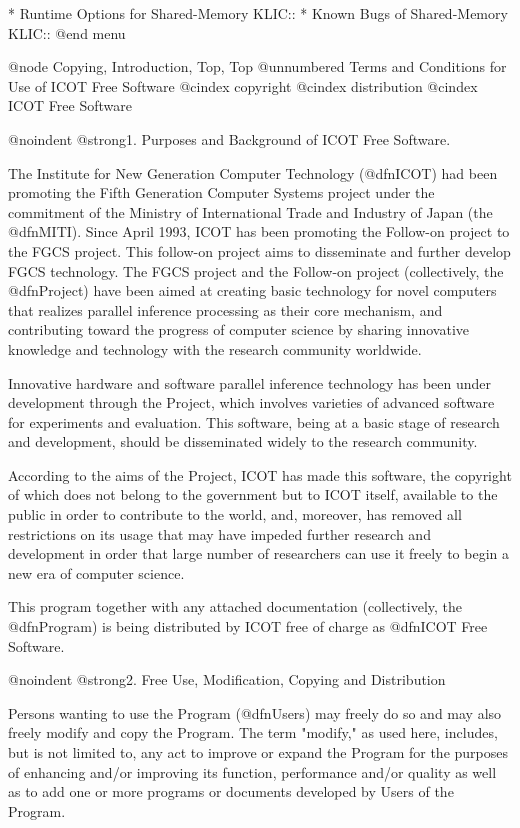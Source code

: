 * Runtime Options for Shared-Memory KLIC::  
* Known Bugs of Shared-Memory KLIC::  
@end menu

@node Copying, Introduction, Top, Top
@unnumbered Terms and Conditions for Use of ICOT Free Software
@cindex copyright
@cindex distribution
@cindex ICOT Free Software

@noindent
@strong{1. Purposes and Background of ICOT Free Software.}

The Institute for New Generation Computer Technology (@dfn{ICOT}) had
been promoting the Fifth Generation Computer Systems project under the
commitment of the Ministry of International Trade and Industry of Japan
(the @dfn{MITI}).  Since April 1993, ICOT has been promoting the
Follow-on project to the FGCS project. This follow-on project aims to
disseminate and further develop FGCS technology.  The FGCS project and
the Follow-on project (collectively, the @dfn{Project}) have been aimed
at creating basic technology for novel computers that realizes parallel
inference processing as their core mechanism, and contributing toward
the progress of computer science by sharing innovative knowledge and
technology with the research community worldwide.

    Innovative hardware and software parallel inference technology has
been under development through the Project, which involves varieties of
advanced software for experiments and evaluation.  This software, being
at a basic stage of research and development, should be disseminated
widely to the research community.

    According to the aims of the Project, ICOT has made this software,
the copyright of which does not belong to the government but to ICOT
itself, available to the public in order to contribute to the world,
and, moreover, has removed all restrictions on its usage that may have
impeded further research and development in order that large number of
researchers can use it freely to begin a new era of computer science.

    This program together with any attached documentation (collectively,
the @dfn{Program}) is being distributed by ICOT free of charge as
@dfn{ICOT Free Software}.

@noindent
@strong{2. Free Use, Modification, Copying and Distribution}

    Persons wanting to use the Program (@dfn{Users}) may freely do so
and may also freely modify and copy the Program.  The term "modify," as
used here, includes, but is not limited to, any act to improve or expand
the Program for the purposes of enhancing and/or improving its function,
performance and/or quality as well as to add one or more programs or
documents developed by Users of the Program.

